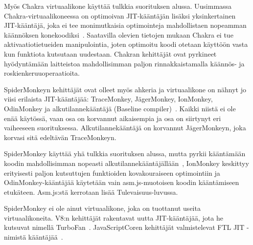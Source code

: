 Myös Chakra virtuaalikone käyttää tulkkia suorituksen alussa. Uusimmassa Chakra-virtuaalikoneessa on optimoivan JIT-kääntäjän lisäksi yksinkertainen JIT-kääntäjä, joka ei tee monimutkaisia optimointeja mahdollistaen nopeamman käännöksen konekoodiksi~\cite{chakra}. Saatavilla olevien tietojen mukaan Chakra ei tue aktivaatiotietueiden manipulointia, joten optimoitu koodi otetaan käyttöön vasta kun funktiota kutsutaan uudestaan. Chakran kehittäjät ovat pyrkineet hyödyntämään laitteistoa mahdollisimman paljon rinnakkaistamalla käännös- ja roskienkeruuoperaatioita.

SpiderMonkeyn kehittäjät ovat olleet myös ahkeria ja virtuaalikone on nähnyt jo viisi erilaista JIT-kääntäjää: TraceMonkey, JägerMonkey, IonMonkey, OdinMonkey ja alkutilannekääntäjä (Baseline compiler)~\cite{monkeys}. Kaikki niistä ei ole enää käytössä, vaan osa on korvannut aikaisempia ja osa on siirtynyt eri vaiheeseen suorituksessa. Alkutilannekääntäjä on korvannut JägerMonkeyn, joka korvasi sitä edeltävän TraceMonkeyn.

SpiderMonkey käyttää yhä tulkkia suorituksen alussa, mutta pyrkii kääntämään koodin mahdollisimman nopeasti alkutilannekääntäjällään~\cite{baseline}, IonMonkey keskittyy erityisesti paljon kutsuttujen funktioiden kovakouraiseen optimointiin ja OdinMonkey-kääntäjää käytetään vain asm.js-muotoisen koodin kääntämiseen etukäteen. Asm.js:stä kerrotaan lisää Tulevaisuus-luvussa.

SpiderMonkey ei ole ainut virtuaalikone, joka on tuottanut useita virtuaalikoneita. V8:n kehittäjät rakentavat uutta JIT-kääntäjää, jota he kutsuvat nimellä TurboFan~\cite{turbofan}. JavaScriptCoren kehittäjät valmistelevat FTL JIT -nimistä kääntäjää~\cite{ftljit}.

\begin{comment}
\begin{itemize}
\item V8 - vain konekoodia - ei tulkkia, baseline, crankshaft(, turbofan) (TULKKI?!)
\item V8: \textbf{JS} -> AST -> native/Hydrogen (ssa) IR
\item JSC - LLInt tulkki, method jit, dfg jit, ftl jit
\item JSC JS -> AST -> \textbf{tavukoodi} (IR) -> native
\item SpiderMonkey - tulkki, traceMonkey, jägerMonkey, ionMonkey
\item SpiderMonkey: JS -> AST -> tavukoodi -> native
\item Chakra - tulkki, simple jit, full jit
\item Chakra: JS -> AST -> \textbf{tavukoodi}
\item SSA-muoto ja de-facto optimoinnit!
\end{itemize}
\end{comment}

